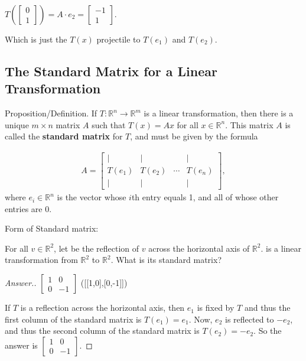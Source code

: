\documentclass{package/notes}
\begin{document}
$T(\left[\begin{array}{c} 0\\1 \end{array} \right])=A\cdot e_2=\left[\begin{array}{c} -1\\1 \end{array} \right]$.

Which is just the $T(x)$ projectile to $T(e_1)$ and $T(e_2)$.


\subsection{The Standard Matrix for a Linear Transformation}

Proposition/Definition. If $T: \mathbb{R}^n\rightarrow \mathbb{R}^m$ is a linear transformation, then there is a unique $m\times n$ matrix $A$ such that $T(x)=Ax$ for all $x\in \mathbb{R}^n$. This matrix $A$ is called the \textbf{standard matrix} for $T$, and must be given by the formula

\begin{align*}
    A = \left[ \begin{array}{cccc} | &  | & &  | \\ T(e_1) &  T(e_2) &  \cdots &  T(e_ n) \\ | &  | & &  | \end{array} \right],
\end{align*}
where $e_i\in \mathbb{R}^n$ is the vector whose $i$th entry equals 1, and all of whose other entries are 0.

Form of Standard matrix:
\begin{problem}
    For all $v\in \mathbb{R}^2$, let  be the reflection of $v$ across the horizontal axis of $\mathbb{R}^2$.  is a linear transformation from $\mathbb{R}^2$ to $\mathbb{R}^2$. What is its standard matrix?
\end{problem}

\begin{proof}[Answer.]
$\left[ \begin{array}{cc} 1&  0 \\ 0 &  -1 \end{array} \right]$ ([[1,0],[0,-1]])

If $T$ is a reflection across the horizontal axis, then $e_1$ is fixed by $T$ and thus the first column of the standard matrix is $T(e_1)=e_1$. Now, $e_2$ is reflected to $-e_2$, and thus the second column of the standard matrix is $T(e_2)=-e_2$. So the answer is $\left[ \begin{array}{cc} 1&  0 \\ 0 &  -1 \end{array} \right].$
\end{proof}
\end{document}
